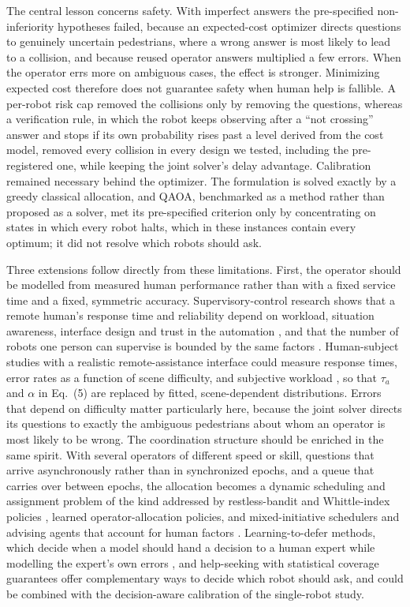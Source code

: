 \documentclass[a4paper,fleqn]{cas-dc}
\begin{document}
The central lesson concerns safety. With imperfect answers the pre-specified non-inferiority hypotheses failed, because an expected-cost optimizer directs questions to genuinely uncertain pedestrians, where a wrong answer is most likely to lead to a collision, and because reused operator answers multiplied a few errors. When the operator errs more on ambiguous cases, the effect is stronger. Minimizing expected cost therefore does not guarantee safety when human help is fallible. A per-robot risk cap removed the collisions only by removing the questions, whereas a verification rule, in which the robot keeps observing after a ``not crossing'' answer and stops if its own probability rises past a level derived from the cost model, removed every collision in every design we tested, including the pre-registered one, while keeping the joint solver's delay advantage. Calibration remained necessary behind the optimizer. The formulation is solved exactly by a greedy classical allocation, and QAOA, benchmarked as a method rather than proposed as a solver, met its pre-specified criterion only by concentrating on states in which every robot halts, which in these instances contain every optimum; it did not resolve which robots should ask.

Three extensions follow directly from these limitations. First, the operator should be modelled from measured human performance rather than with a fixed service time and a fixed, symmetric accuracy. Supervisory-control research shows that a remote human's response time and reliability depend on workload,
situation awareness, interface design and trust in the automation \cite{Sheridan1992,Endsley1995,Parasuraman2000,LeeSee2004}, and that the number of robots one person can supervise is bounded by the same factors \cite{Crandall2005,CummingsMitchell2008}. Human-subject studies with a realistic remote-assistance interface could measure response times, error rates as a function of scene difficulty, and subjective workload \cite{HartStaveland1988}, so that $\tau_a$ and $\alpha$ in Eq.~(5) are replaced by fitted, scene-dependent distributions. Errors that depend on difficulty matter particularly here, because the joint solver directs its questions to exactly the ambiguous pedestrians about whom an operator is most likely to be wrong. The coordination structure should be enriched in the same spirit. With several operators of different speed or skill, questions that arrive asynchronously rather than in synchronized epochs, and a queue that carries over between epochs, the allocation becomes a dynamic scheduling and assignment problem of the kind addressed by restless-bandit and Whittle-index policies \cite{Whittle1988,Dahiya2022}, learned operator-allocation policies, and mixed-initiative schedulers and advising agents that account for human factors \cite{Gombolay2017,Rosenfeld2017,MusicHirche2017}. Learning-to-defer methods, which decide when a model should hand a decision to a human expert while modelling the expert's own errors \cite{Madras2018,MozannarSontag2020}, and help-seeking with statistical coverage guarantees  offer complementary ways to decide which robot should ask, and could be combined with the decision-aware calibration of the single-robot study.
\end{document}
